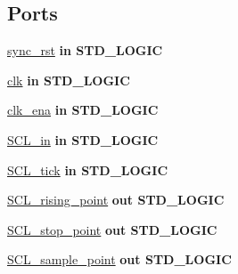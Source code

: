 \subsection*{Ports}
 \begin{DoxyCompactItemize}
\item 
\hyperlink{class_s_c_l__detect_a3495b88db081463071853b171449fc35}{sync\+\_\+rst}  {\bfseries {\bfseries \textcolor{vhdlchar}{in}\textcolor{vhdlchar}{ }}} {\bfseries \textcolor{vhdlchar}{S\+T\+D\+\_\+\+L\+O\+G\+IC}\textcolor{vhdlchar}{ }} 
\item 
\hyperlink{class_s_c_l__detect_a6231b307b7958b6060563aa2a93d345a}{clk}  {\bfseries {\bfseries \textcolor{vhdlchar}{in}\textcolor{vhdlchar}{ }}} {\bfseries \textcolor{vhdlchar}{S\+T\+D\+\_\+\+L\+O\+G\+IC}\textcolor{vhdlchar}{ }} 
\item 
\hyperlink{class_s_c_l__detect_a3313e71ab116de6fc03014f85009a19d}{clk\+\_\+ena}  {\bfseries {\bfseries \textcolor{vhdlchar}{in}\textcolor{vhdlchar}{ }}} {\bfseries \textcolor{vhdlchar}{S\+T\+D\+\_\+\+L\+O\+G\+IC}\textcolor{vhdlchar}{ }} 
\item 
\hyperlink{class_s_c_l__detect_a8720760a9f71f283c56ace58995c6f62}{S\+C\+L\+\_\+in}  {\bfseries {\bfseries \textcolor{vhdlchar}{in}\textcolor{vhdlchar}{ }}} {\bfseries \textcolor{vhdlchar}{S\+T\+D\+\_\+\+L\+O\+G\+IC}\textcolor{vhdlchar}{ }} 
\item 
\hyperlink{class_s_c_l__detect_aedf8a20970ccae39bf50dfba7bbc3906}{S\+C\+L\+\_\+tick}  {\bfseries {\bfseries \textcolor{vhdlchar}{in}\textcolor{vhdlchar}{ }}} {\bfseries \textcolor{vhdlchar}{S\+T\+D\+\_\+\+L\+O\+G\+IC}\textcolor{vhdlchar}{ }} 
\item 
\hyperlink{class_s_c_l__detect_a135a47e67c2b20d338472688e7d5711c}{S\+C\+L\+\_\+rising\+\_\+point}  {\bfseries {\bfseries \textcolor{vhdlchar}{out}\textcolor{vhdlchar}{ }}} {\bfseries \textcolor{vhdlchar}{S\+T\+D\+\_\+\+L\+O\+G\+IC}\textcolor{vhdlchar}{ }} 
\item 
\hyperlink{class_s_c_l__detect_aea1212f3a10abad1135277ea5a2ea801}{S\+C\+L\+\_\+stop\+\_\+point}  {\bfseries {\bfseries \textcolor{vhdlchar}{out}\textcolor{vhdlchar}{ }}} {\bfseries \textcolor{vhdlchar}{S\+T\+D\+\_\+\+L\+O\+G\+IC}\textcolor{vhdlchar}{ }} 
\item 
\hyperlink{class_s_c_l__detect_ab69d9d1ce395cdf6eae705ccab587f94}{S\+C\+L\+\_\+sample\+\_\+point}  {\bfseries {\bfseries \textcolor{vhdlchar}{out}\textcolor{vhdlchar}{ }}} {\bfseries \textcolor{vhdlchar}{S\+T\+D\+\_\+\+L\+O\+G\+IC}\textcolor{vhdlchar}{ }} 
\item 

\end{DoxyCompactItemize}
